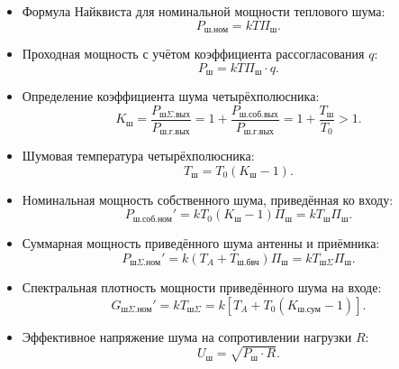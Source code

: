 \documentclass[12pt,a4paper]{article}
\begin{document}
\begin{itemize}
    \item Формула Найквиста для номинальной мощности теплового шума:
    \begin{equation}
    P_{\text{ш.ном}} = k T \Pi_{\text{ш}}.
    \end{equation}
    \item Проходная мощность с учётом коэффициента рассогласования $q$:
    \begin{equation}
    P_{\text{ш}} = k T \Pi_{\text{ш}} \cdot q.
    \end{equation}
    \item Определение коэффициента шума четырёхполюсника:
    \begin{equation}
    K_{\text{ш}} = \frac{P_{\text{ш}\Sigma.\text{вых}}}{P_{\text{ш.г}.\text{вых}}} = 1 + \frac{P_{\text{ш.соб}.\text{вых}}}{P_{\text{ш.г}.\text{вых}}} = 1 + \frac{T_{\text{ш}}}{T_0} > 1.
    \end{equation}
    \item Шумовая температура четырёхполюсника:
    \begin{equation}
    T_{\text{ш}} = T_0 (K_{\text{ш}} - 1).
    \end{equation}
    \item Номинальная мощность собственного шума, приведённая ко входу:
    \begin{equation}
    P_{\text{ш.соб.ном}}' = k T_0 (K_{\text{ш}} - 1) \Pi_{\text{ш}} = k T_{\text{ш}} \Pi_{\text{ш}}.
    \end{equation}
    \item Суммарная мощность приведённого шума антенны и приёмника:
    \begin{equation}
    P_{\text{ш}\Sigma.\text{ном}}' = k (T_A + T_{\text{ш.бвч}}) \Pi_{\text{ш}} = k T_{\text{ш}\Sigma} \Pi_{\text{ш}}.
    \end{equation}
    \item Спектральная плотность мощности приведённого шума на входе:
    \begin{equation}
    G_{\text{ш}\Sigma.\text{ном}}' = k T_{\text{ш}\Sigma} = k [T_A + T_0 (K_{\text{ш.сум}} - 1)].
    \end{equation}
    \item Эффективное напряжение шума на сопротивлении нагрузки $R$:
    \begin{equation}
    U_{\text{ш}} = \sqrt{P_{\text{ш}} \cdot R}.
    \end{equation}
\end{itemize}
\end{document}
